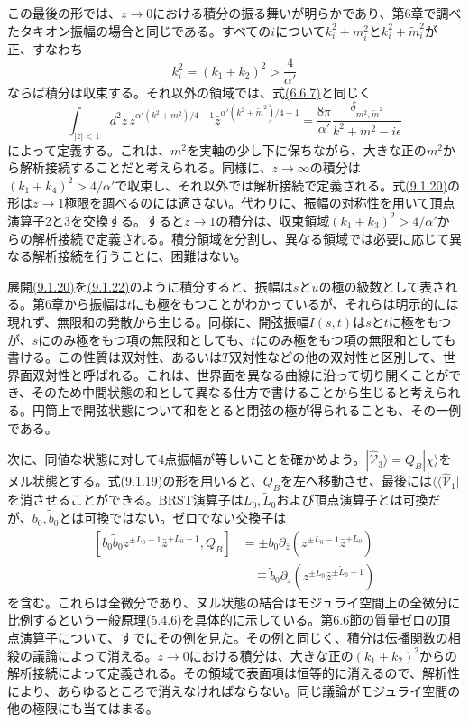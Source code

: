 この最後の形では、$z\to0$における積分の振る舞いが明らかであり、第6章で調べたタキオン振幅の場合と同じである。すべての$i$について$k_i^2+m_i^2$と$k_i^2+\tilde m_i^2$が正、すなわち
\begin{equation}
 k_i^2=(k_1+k_2)^2>\frac4{\alpha'}
 \tag{9.1.21}\label{eq:9.1.21}
\end{equation}
ならば積分は収束する。それ以外の領域では、式\hyperref[eq:6.6.7]{(6.6.7)}と同じく
\begin{equation}
 \int_{|z|<1}d^2z\,
 z^{\alpha'(k^2+m^2)/4-1}\bar z^{\alpha'(k^2+\tilde m^2)/4-1}
 =\frac{8\pi}{\alpha'}\frac{\delta_{m^2,\tilde m^2}}{k^2+m^2-i\epsilon}
 \tag{9.1.22}\label{eq:9.1.22}
\end{equation}
によって定義する。これは、$m^2$を実軸の少し下に保ちながら、大きな正の$m^2$から解析接続することだと考えられる。同様に、$z\to\infty$の積分は$(k_1+k_4)^2>4/\alpha'$で収束し、それ以外では解析接続で定義される。式\hyperref[eq:9.1.20]{(9.1.20)}の形は$z\to1$極限を調べるのには適さない。代わりに、振幅の対称性を用いて頂点演算子2と3を交換する。すると$z\to1$の積分は、収束領域$(k_1+k_3)^2>4/\alpha'$からの解析接続で定義される。積分領域を分割し、異なる領域では必要に応じて異なる解析接続を行うことに、困難はない。

展開\hyperref[eq:9.1.20]{(9.1.20)}を\hyperref[eq:9.1.22]{(9.1.22)}のように積分すると、振幅は$s$と$u$の極の級数として表される。第6章から振幅は$t$にも極をもつことがわかっているが、それらは明示的には現れず、無限和の発散から生じる。同様に、開弦振幅$I(s,t)$は$s$と$t$に極をもつが、$s$にのみ極をもつ項の無限和としても、$t$にのみ極をもつ項の無限和としても書ける。この性質は双対性、あるいは$T$双対性などの他の双対性と区別して、世界面双対性と呼ばれる。これは、世界面を異なる曲線に沿って切り開くことができ、そのため中間状態の和として異なる仕方で書けることから生じると考えられる。円筒上で開弦状態について和をとると閉弦の極が得られることも、その一例である。

次に、同値な状態に対して4点振幅が等しいことを確かめよう。$|\widehat{\mathcal V}_3\rangle=Q_B|\chi\rangle$をヌル状態とする。式\hyperref[eq:9.1.19]{(9.1.19)}の形を用いると、$Q_B$を左へ移動させ、最後には$\langle\!\langle\widehat{\mathcal V}_1|$を消させることができる。BRST演算子は$L_0,\tilde L_0$および頂点演算子とは可換だが、$b_0,\tilde b_0$とは可換ではない。ゼロでない交換子は
\begin{equation}
 \begin{aligned}
 [b_0\tilde b_0 z^{\pm L_0-1}\bar z^{\pm\tilde L_0-1},Q_B]
 &=\pm b_0\partial_{\bar z}
 (z^{\pm L_0-1}\bar z^{\pm\tilde L_0})\\
 &\quad\mp\tilde b_0\partial_z
 (z^{\pm L_0}\bar z^{\pm\tilde L_0-1})
 \end{aligned}
 \tag{9.1.23}\label{eq:9.1.23}
\end{equation}
を含む。これらは全微分であり、ヌル状態の結合はモジュライ空間上の全微分に比例するという一般原理\hyperref[eq:5.4.6]{(5.4.6)}を具体的に示している。第6.6節の質量ゼロの頂点演算子について、すでにその例を見た。その例と同じく、積分は伝播関数の相殺の議論によって消える。$z\to0$における積分は、大きな正の$(k_1+k_2)^2$からの解析接続によって定義される。その領域で表面項は恒等的に消えるので、解析性により、あらゆるところで消えなければならない。同じ議論がモジュライ空間の他の極限にも当てはまる。

